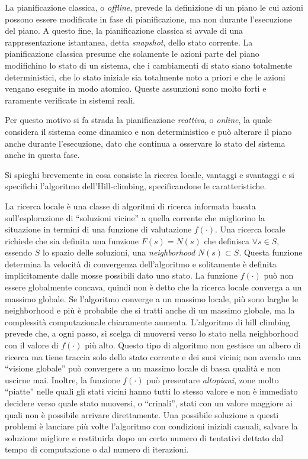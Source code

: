 \documentclass[answers, a4paper, 11pt]{exam}
\begin{document}
\begin{questions}
\begin{solution}
  La pianificazione classica, o \emph{offline}, prevede la definizione di un piano le cui azioni possono essere modificate in fase di pianificazione, ma non durante l'esecuzione del piano. 
  A questo fine, la pianificazione classica si avvale di una rappresentazione istantanea, detta \emph{snapshot}, dello stato corrente. 
  La pianificazione classica presume che solamente le azioni parte del piano modifichino lo stato di un sistema, che i cambiamenti di stato siano totalmente deterministici, che lo stato iniziale sia totalmente noto a priori e che le azioni vengano eseguite in modo atomico. 
  Queste assunzioni sono molto forti e raramente verificate in sistemi reali. 
  
  Per questo motivo si fa strada la pianificazione \emph{reattiva}, o \emph{online}, la quale considera il sistema come dinamico e non deterministico e può alterare il piano anche durante l'esecuzione, dato che continua a osservare lo stato del sistema anche in questa fase. 
\end{solution}
\question Si spieghi brevemente in cosa consiste la ricerca locale, vantaggi e svantaggi e si specifichi l’algoritmo dell’Hill-climbing, specificandone le caratteristiche.
\begin{solution}
  La ricerca locale è una classe di algoritmi di ricerca informata basata sull'esplorazione di ``soluzioni vicine'' a quella corrente che migliorino la situazione in termini di una funzione di valutazione $f(\cdot)$. 
Una ricerca locale richiede che sia definita una funzione $F(s) = N(s)$ che definisca $\forall s \in S$, essendo $S$ lo spazio delle soluzioni, una \emph{neighborhood} $N(s) \subset S$. 
Questa funzione determina la velocità di convergenza dell'algoritmo e solitamente è definita implicitamente dalle mosse possibili dato uno stato. 
  La funzione $f(\cdot)$ può non essere globalmente concava, quindi non è detto che la ricerca locale converga a un massimo globale.
  Se l'algoritmo converge a un massimo locale, più sono larghe le neighborhood e più è probabile che si tratti anche di un massimo globale, ma la complessità computazionale chiaramente aumenta. 
  L'algoritmo di hill climbing prevede che, a ogni passo, si scelga di muoversi verso lo stato nella neighborhood con il valore di $f(\cdot)$ più alto. 
  Questo tipo di algoritmo non gestisce un albero di ricerca ma tiene traccia solo dello stato corrente e dei suoi vicini; non avendo una ``visione globale'' può  convergere a un massimo locale di bassa qualità e non uscirne mai.
  Inoltre, la funzione $f(\cdot)$ può presentare \emph{altopiani}, zone molto ``piatte'' nelle quali gli stati vicini hanno tutti lo stesso valore e non è immediato decidere verso quale stato muoversi, o ``crinali'', stati con un valore maggiore ai quali non è possibile arrivare direttamente. 
  Una possibile soluzione a questi problemi è lanciare più volte l'algoritmo con condizioni iniziali casuali, salvare la soluzione migliore e restituirla dopo un certo numero di tentativi dettato dal tempo di computazione o dal numero di iterazioni. 
\end{solution}


\end{questions}
\end{document}
